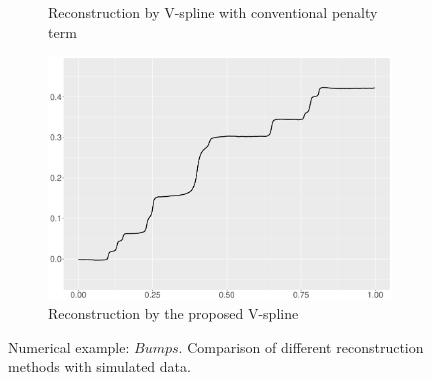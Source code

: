 \begin{figure}
\begin{subfigure}{0.45\textwidth}
    \caption{Reconstruction by V-spline with conventional penalty term}
    \end{subfigure}
    \begin{subfigure}{0.45\textwidth}
    \centering
    \includegraphics[width=\linewidth,height=0.45\textwidth]{Chapters/02TractorSplineTheory/plot/ggplot/ggBumpsTractor.pdf}
    \caption{Reconstruction by the proposed V-spline}
    \end{subfigure}
\caption{Numerical example: $\textit{Bumps}$. Comparison of different reconstruction methods with simulated data.}\label{num2}
 \end{figure}






